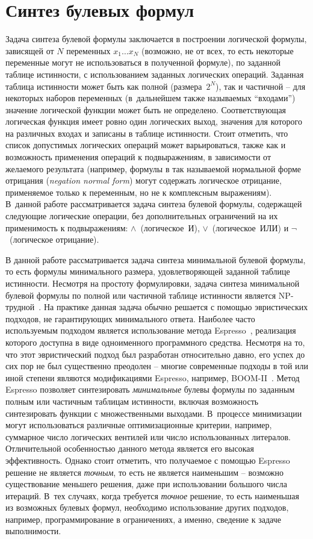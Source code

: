 \section{Синтез булевых формул}
\label{sub:formula-synthesis}

Задача синтеза булевой формулы заключается в построении логической формулы, зависящей от $N$ переменных $x_{1}\ldots x_{N}$ (возможно, не от всех, то есть некоторые переменные могут не использоваться в полученной формуле), по заданной таблице истинности, с использованием заданных логических операций.
Заданная таблица истинности может быть как полной (размера~$2^{N}$), так и частичной \--- для некоторых наборов переменных (в~дальнейшем также называемых \enquote{входами}) значение логической функции может быть не определено.
Соответствующая логическая функция имеет ровно один логических выход, значения для которого на различных входах и записаны в таблице истинности.
Стоит отметить, что список допустимых логических операций может варьироваться, также как и возможность применения операций к подвыражениям, в зависимости от желаемого результата (например, формулы в так называемой нормальной форме отрицания (\textit{negation normal form}) могут содержать логическое отрицание, применяемое только к переменным, но не к комплексным выражениям).
В~данной работе рассматривается задача синтеза булевой формулы, содержащей следующие логические операции, без дополнительных ограничений на их применимость к подвыражениям: $\land$~(логическое~И), $\lor$~(логическое~ИЛИ) и $\neg$~(логическое отрицание).

В данной работе рассматривается задача синтеза минимальной булевой формулы, то есть формулы минимального размера, удовлетворяющей заданной таблице истинности.
Несмотря на простоту формулировки, задача синтеза минимальной булевой формулы по полной или частичной таблице истинности является NP-трудной~\cite{akshay2018}.
На практике данная задача обычно решается с помощью эвристических подходов, не гарантирующих минимального ответа.
Наиболее часто используемым подходом является использование метода Espresso~\cite{brayton1984}, реализация которого доступна в виде одноименного программного средства.
Несмотря на то, что этот эвристический подход был разработан относительно давно, его успех до сих пор не был существенно преодолен \--- многие современные подходы в той или иной степени являются модификациями Espresso, например, BOOM-II~\cite{fiser2006}.
Метод Espresso позволяет синтезировать \emph{минимальные} булевы формулы по заданным полным или частичным таблицам истинности, включая возможность синтезировать функции с множественными выходами.
В~процессе минимизации могут использоваться различные оптимизационные критерии, например, суммарное число логических вентилей или число использованных литералов.
Отличительной особенностью данного метода является его высокая эффективность.
Однако стоит отметить, что получаемое с помощью Espresso решение не является \emph{точным}, то есть не является наименьшим \--- возможно существование меньшего решения, даже при использовании большого числа итераций.
В~тех случаях, когда требуется \emph{точное} решение, то есть наименьшая из возможных булевых формул, необходимо использование других подходов, например, программирование в ограничениях, а именно, сведение к задаче выполнимости.

